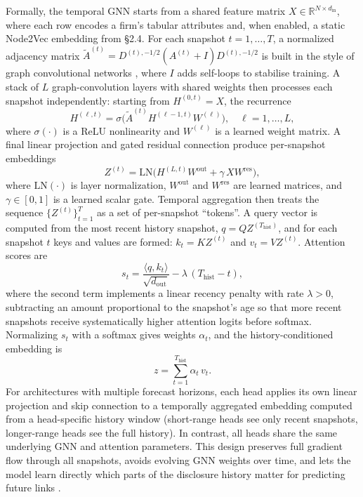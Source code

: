 Formally, the temporal GNN starts from a shared feature matrix \(X \in \mathbb{R}^{N \times d_{\text{in}}}\), where each row encodes a firm's tabular attributes and, when enabled, a static Node2Vec embedding from \S2.4. For each snapshot \(t = 1,\dots,T\), a normalized adjacency matrix \(\tilde{A}^{(t)} = D^{(t),-1/2} (A^{(t)} + I) D^{(t),-1/2}\) is built in the style of graph convolutional networks \parencite{kipf_semi-supervised_2017}, where \(I\) adds self-loops to stabilise training. A stack of \(L\) graph-convolution layers with shared weights then processes each snapshot independently: starting from \(H^{(0,t)} = X\), the recurrence
\[
H^{(\ell,t)} = \sigma\!\bigl(\tilde{A}^{(t)} H^{(\ell-1,t)} W^{(\ell)}\bigr),
\quad \ell = 1,\dots,L,
\]
where \(\sigma(\cdot)\) is a ReLU nonlinearity and \(W^{(\ell)}\) is a learned weight matrix. A final linear projection and gated residual connection produce per-snapshot embeddings
\[
Z^{(t)} = \mathrm{LN}\!\bigl(H^{(L,t)} W^{\text{out}} + \gamma\, X W^{\text{res}}\bigr),
\]
where \(\mathrm{LN}(\cdot)\) is layer normalization, \(W^{\text{out}}\) and \(W^{\text{res}}\) are learned matrices, and \(\gamma \in [0,1]\) is a learned scalar gate. Temporal aggregation then treats the sequence \(\{Z^{(t)}\}_{t=1}^{T}\) as a set of per-snapshot ``tokens''. A query vector is computed from the most recent history snapshot, \(q = Q Z^{(T_{\text{hist}})}\), and for each snapshot \(t\) keys and values are formed: \(k_t = K Z^{(t)}\) and \(v_t = V Z^{(t)}\). Attention scores are
\[
s_t = \frac{\langle q, k_t\rangle}{\sqrt{d_{\text{out}}}} - \lambda\,(T_{\text{hist}} - t),
\]
where the second term implements a linear recency penalty with rate \(\lambda > 0\), subtracting an amount proportional to the snapshot's age so that more recent snapshots receive systematically higher attention logits before softmax. Normalizing \(s_t\) with a softmax gives weights \(\alpha_t\), and the history-conditioned embedding is
\[
z = \sum_{t=1}^{T_{\text{hist}}} \alpha_t\, v_t.
\]
For architectures with multiple forecast horizons, each head applies its own linear projection and skip connection to a temporally aggregated embedding computed from a head-specific history window (short-range heads see only recent snapshots, longer-range heads see the full history). In contrast, all heads share the same underlying GNN and attention parameters. This design preserves full gradient flow through all snapshots, avoids evolving GNN weights over time, and lets the model learn directly which parts of the disclosure history matter for predicting future links \parencite{rossi_temporal_2020,xu_inductive_2020}.

